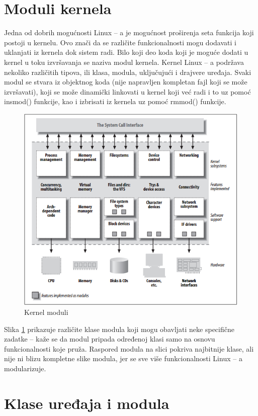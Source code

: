 \documentclass[a4paper, 12pt, diplomski]{etf}
\begin{document}
	\section{Moduli kernela}

	Jedna od dobrih mogućnosti Linux – a je mogućnost proširenja seta funkcija koji postoji u kernelu. Ovo znači da se različite funkcionalnosti mogu dodavati i uklanjati iz kernela dok sistem radi. Bilo koji deo koda koji je moguće dodati u kernel u toku izvršavanja se naziva modul kernela. Kernel Linux – a podržava nekoliko različitih tipova, ili klasa, modula, uključujući i drajvere uređaja. Svaki modul se stvara iz objektnog koda (nije napravljen kompletan fajl koji se može izvršavati), koji se može dinamički linkovati u kernel koji već radi i to uz pomoć insmod() funkcije, kao i izbrisati iz kernela uz pomoć rmmod() funkcije.

	\begin{figure}[htb]
		\centering
		\includegraphics[width=.8\textwidth]{images/kernelsplit.png}
		\caption{Kernel moduli}
		\label{fig:kernelmodul}
	\end{figure}

	Slika \ref{fig:kernelmodul} prikazuje različite klase modula koji mogu obavljati neke specifične zadatke – kaže se da modul pripada određenoj klasi samo na osnovu funkcionalnosti koje pruža. Raspored modula na slici pokriva najbitnije klase, ali nije ni blizu kompletne slike modula, jer se sve više funkcionalnosti Linux – a modularizuje.

	\section{Klase uređaja i modula}
\end{document}
